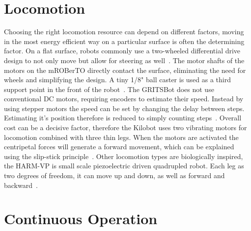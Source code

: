 \section{Locomotion}
\label{sec:locomotion}

Choosing the right locomotion resource can depend on different factors, moving in the most energy efficient way on a particular surface is often the determining factor.
On a flat surface, robots commonly use a two-wheeled differential drive design to not only move but allow for steering as well~\cite{sabelhaus_icra_2013, pickem_icra_2015}.
The motor shafts of the motors on the mROBerTO directly contact the surface, eliminating the need for wheels and simplifying the design.
A tiny 1/8" ball caster is used as a third support point in the front of the robot~\cite{kim_iros_2016}.
The GRITSBot does not use conventional DC motors, requiring encoders to estimate their speed. 
Instead by using stepper motors the speed can be set by changing the delay between steps. 
Estimating it's position therefore is reduced to simply counting steps~\cite{pickem_icra_2015}.  
Overall cost can be a decisive factor, therefore the Kilobot uses two vibrating motors for locomotion combined with three thin legs.
When the motors are activated the centripetal forces will generate a forward movement, which can be explained using the slip-stick principle~\cite{rubenstein_icra_2012}.
Other locomotion types are biologically inspired, the HARM-VP is small scale piezoelectric driven quadrupled robot.
Each leg as two degrees of freedom, it can move up and down, as well as forward and backward~\cite{baisch_iros_2013}.

\section{Continuous Operation}
\label{sec:continous_operation}

